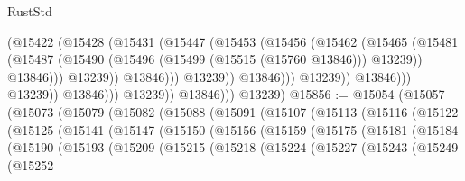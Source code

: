 \begin{lexlean}{RustStd}
\begin{coremodule}
                                          (@15422
                                            (@15428
                                              (@15431
                                                (@15447
                                                  (@15453
                                                    (@15456
                                                      (@15462
                                                        (@15465
                                                          (@15481
                                                            (@15487
                                                              (@15490
                                                                (@15496
                                                                  (@15499 (@15515 (@15760 @13846)))
                                                                  @13239))
                                                              @13846)))
                                                        @13239))
                                                    @13846)))
                                              @13239))
                                          @13846)))
                                    @13239))
                                @13846)))
                          @13239))
                      @13846)))
                @13239))
            @13846)))
      @13239)
@15856 := @15054
    (@15057
      (@15073
        (@15079
          (@15082
            (@15088
              (@15091
                (@15107
                  (@15113
                    (@15116
                      (@15122
                        (@15125
                          (@15141
                            (@15147
                              (@15150
                                (@15156
                                  (@15159
                                    (@15175
                                      (@15181
                                        (@15184
                                          (@15190
                                            (@15193
                                              (@15209
                                                (@15215
                                                  (@15218
                                                    (@15224
                                                      (@15227
                                                        (@15243
                                                          (@15249
                                                            (@15252

\end{coremodule}
\end{lexlean}
